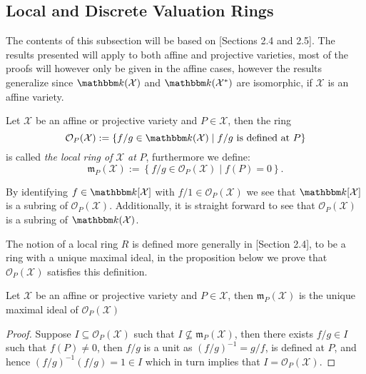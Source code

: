 \subsection{Local and Discrete Valuation Rings}\label{subsec:local_rings_and_dvr}
The contents of this subsection will be based on \cite{Fulton}[Sections 2.4 and 2.5]. The results presented will apply to both affine and projective varieties, most of the proofs will however only be given in the affine cases, however the results generalize since $\K(\mathcal{X})$ and $\K(\mathcal{X}^{*})$ are isomorphic, if $\mathcal{X}$ is an affine variety.

\begin{definition}
  Let $\mathcal{X}$ be an affine or projective variety and $P \in \mathcal{X}$, then the ring
  \begin{equation*}
    \mathcal{O}_{P}(\mathcal{X}) := \left\{f / g \in \K(\mathcal{X}) \mid f / g \text{ is defined at } P \right\}
  \end{equation*}
  is called \textit{the local ring of} $\mathcal{X}$ \textit{at} $P$, furthermore we define:
  \begin{equation*}
    \mathfrak{m}_{P}(\mathcal{X}) := \left\{f / g \in \mathcal{O}_{P}(\mathcal{X}) \mid f(P) = 0\right\}.
  \end{equation*}
\end{definition}
By identifying $f \in \K[\mathcal{X}]$ with $f / 1 \in \mathcal{O}_P(\mathcal{X})$ we see that $\K[\mathcal{X}]$ is a subring of $\mathcal{O}_{P}(\mathcal{X})$. Additionally, it is straight forward to see that $\mathcal{O}_P(\mathcal{X})$ is a subring of $\K(\mathcal{X})$.

The notion of a local ring $R$ is defined more generally in \cite{lang}[Section 2.4], to be a ring with a unique maximal ideal, in the proposition below we prove that $\mathcal{O}_P(\mathcal{X})$ satisfies this definition.
\begin{proposition}\label{prop:maximal_ideal_of_local_ring}
  Let $\mathcal{X}$ be an affine or projective variety and $P \in \mathcal{X}$, then $\mathfrak{m}_{P}(\mathcal{X})$ is the unique maximal ideal of $\mathcal{O}_P(\mathcal{X})$
\end{proposition}
\begin{proof}
  Suppose $I \subseteq \mathcal{O}_P(\mathcal{X})$ such that $I \not \subseteq \mathfrak{m}_P(\mathcal{X})$, then there exists $f / g \in I$ such that $f(P) \neq 0$, then $f / g$ is a unit as $(f / g)^{-1} = g / f$, is defined at $P$, and hence $(f / g)^{-1}(f / g) = 1 \in I$ which in turn implies that $I = \mathcal{O}_{P}(\mathcal{X})$.
\end{proof}

